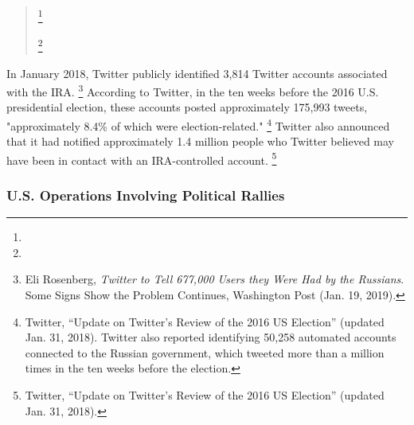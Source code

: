 \begin{quote}

\footnote{}

\footnote{}

\end{quote}

In January 2018, Twitter publicly identified 3,814 Twitter accounts associated with the IRA.%
\footnote{Eli Rosenberg, \textit{Twitter to Tell 677,000 Users they Were Had by the Russians}.
Some Signs Show the Problem Continues, Washington Post (Jan. 19, 2019).}
According to Twitter, in the ten weeks before the 2016 U.S. presidential election, these accounts posted approximately 175,993 tweets, "approximately 8.4\% of which were election-related."%
\footnote{Twitter, “Update on Twitter's Review of the 2016 US Election” (updated Jan. 31, 2018).
Twitter also reported identifying 50,258 automated accounts connected to the Russian government, which tweeted more than a million times in the ten weeks before the election.}
Twitter also announced that it had notified approximately 1.4 million people who Twitter believed may have been in contact with an IRA-controlled account.%
\footnote{Twitter, “Update on Twitter's Review of the 2016 US Election” (updated Jan. 31, 2018).}

\subsubsection{U.S. Operations Involving Political Rallies}

